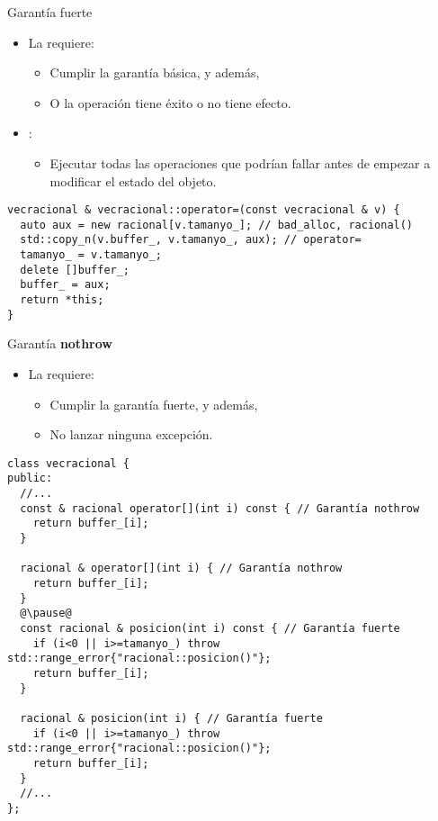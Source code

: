 \begin{frame}[t,fragile]{Garantía fuerte}
\begin{itemize}
  \item La  requiere:
    \begin{itemize}
      \item Cumplir la garantía básica, y además,
      \item O la operación tiene éxito o no tiene efecto.
    \end{itemize}

  \item {}:
    \begin{itemize}
      \item Ejecutar todas las operaciones que podrían fallar antes de empezar 
            a modificar el estado del objeto.
    \end{itemize}
\end{itemize}

\begin{lstlisting}
vecracional & vecracional::operator=(const vecracional & v) {
  auto aux = new racional[v.tamanyo_]; // bad_alloc, racional()
  std::copy_n(v.buffer_, v.tamanyo_, aux); // operator=
  tamanyo_ = v.tamanyo_;
  delete []buffer_;
  buffer_ = aux;
  return *this;
}
\end{lstlisting}
\end{frame}

\begin{frame}[t,fragile]{Garantía \textbf{nothrow}}
\begin{itemize}
  \item La  requiere:
    \begin{itemize}
      \item Cumplir la garantía fuerte, y además,
      \item No lanzar ninguna excepción.
    \end{itemize}
\end{itemize}

\begin{lstlisting}[basicstyle=\tiny,escapechar=@]
class vecracional {
public:
  //...
  const & racional operator[](int i) const { // Garantía nothrow
    return buffer_[i];
  }

  racional & operator[](int i) { // Garantía nothrow
    return buffer_[i];
  }
  @\pause@
  const racional & posicion(int i) const { // Garantía fuerte
    if (i<0 || i>=tamanyo_) throw std::range_error{"racional::posicion()"};
    return buffer_[i];
  }

  racional & posicion(int i) { // Garantía fuerte
    if (i<0 || i>=tamanyo_) throw std::range_error{"racional::posicion()"};
    return buffer_[i];
  }
  //...
};
\end{lstlisting}
\end{frame}
